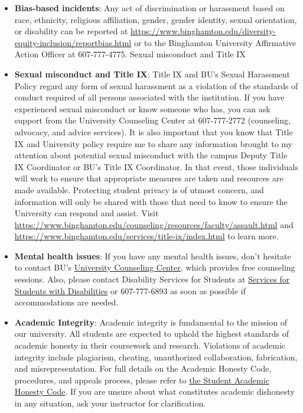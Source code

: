 \documentclass[11pt, a4paper]{article}
\begin{document}
\begin{itemize}
    \item \textbf{Bias-based incidents}: Any act of discrimination or harassment based on race, ethnicity, religious affiliation, gender, gender identity, sexual orientation, or disability can be reported at \url{https://www.binghamton.edu/diversity-equity-inclusion/reportbias.html} or to the Binghamton University Affirmative Action Officer at 607-777-4775.
    Sexual misconduct and Title IX
    \item \textbf{Sexual misconduct and Title IX}: Title IX and BU’s Sexual Harassment Policy regard any form of sexual harassment as a violation of the standards of conduct required of all persons associated with the institution. If you have experienced sexual misconduct or know someone who has, you can ask support from the University Counseling Center at 607-777-2772 (counseling, advocacy, and advice services). It is also important that you know that Title IX and University policy require me to share any information brought to my attention about potential sexual misconduct with the campus Deputy Title IX Coordinator or BU’s Title IX Coordinator. In that event, those individuals will work to ensure that appropriate measures are taken and resources are made available. Protecting student privacy is of utmost concern, and information will only be shared with those that need to know to ensure the University can respond and assist. Visit \url{https://www.binghamton.edu/counseling/resources/faculty/assault.html} and \url{https://www.binghamton.edu/services/title-ix/index.html} to learn more.
    \item \textbf{Mental health issues}: If you have any mental health issues, don’t hesitate to contact BU’s \href{https://www.binghamton.edu/counseling/index.html}{University Counseling Center}, which provides free counseling sessions. Also, please contact Disability Services for Students at \href{https://www.binghamton.edu/ssd/index.html}{Services for Students with Disabilities} or 607-777-6893 as soon as possible if accommodations are needed.
    \item \textbf{Academic Integrity}: Academic integrity is fundamental to the mission of our university. All students are expected to uphold the highest standards of academic honesty in their coursework and research. Violations of academic integrity include plagiarism, cheating, unauthorized collaboration, fabrication, and misrepresentation. For full details on the Academic Honesty Code, procedures, and appeals process, please refer to \href{https://www.binghamton.edu/watson/about/academic-honesty.html}{the Student Academic Honesty Code}. If you are unsure about what constitutes academic dishonesty in any situation, ask your instructor for clarification.
\end{itemize}

\end{document}
